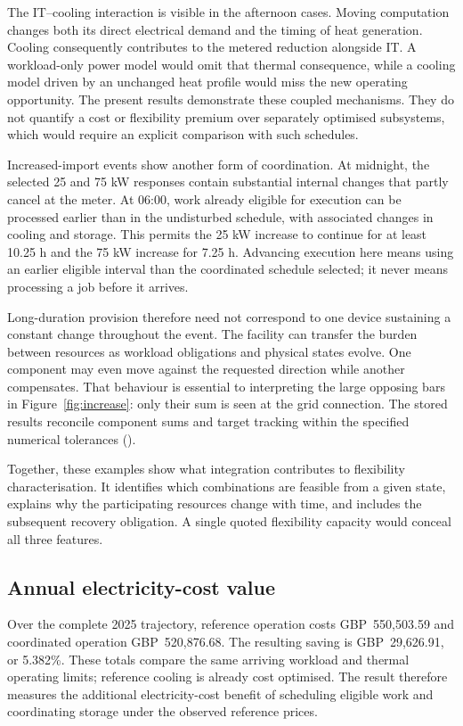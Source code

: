 The IT--cooling interaction is visible in the afternoon cases. Moving computation changes both its direct electrical demand and the timing of heat generation. Cooling consequently contributes to the metered reduction alongside IT. A workload-only power model would omit that thermal consequence, while a cooling model driven by an unchanged heat profile would miss the new operating opportunity. The present results demonstrate these coupled mechanisms. They do not quantify a cost or flexibility premium over separately optimised subsystems, which would require an explicit comparison with such schedules.

Increased-import events show another form of coordination. At midnight, the selected 25 and 75 kW responses contain substantial internal changes that partly cancel at the meter. At 06:00, work already eligible for execution can be processed earlier than in the undisturbed schedule, with associated changes in cooling and storage. This permits the 25 kW increase to continue for at least 10.25 h and the 75 kW increase for 7.25 h. Advancing execution here means using an earlier eligible interval than the coordinated schedule selected; it never means processing a job before it arrives.

Long-duration provision therefore need not correspond to one device sustaining a constant change throughout the event. The facility can transfer the burden between resources as workload obligations and physical states evolve. One component may even move against the requested direction while another compensates. That behaviour is essential to interpreting the large opposing bars in Figure~\ref{fig:increase}: only their sum is seen at the grid connection. The stored results reconcile component sums and target tracking within the specified numerical tolerances ().

Together, these examples show what integration contributes to flexibility characterisation. It identifies which combinations are feasible from a given state, explains why the participating resources change with time, and includes the subsequent recovery obligation. A single quoted flexibility capacity would conceal all three features.

\subsection{Annual electricity-cost value}
Over the complete 2025 trajectory, reference operation costs GBP~550,503.59 and coordinated operation GBP~520,876.68. The resulting saving is GBP~29,626.91, or 5.382\%. These totals compare the same arriving workload and thermal operating limits; reference cooling is already cost optimised. The result therefore measures the additional electricity-cost benefit of scheduling eligible work and coordinating storage under the observed reference prices.

